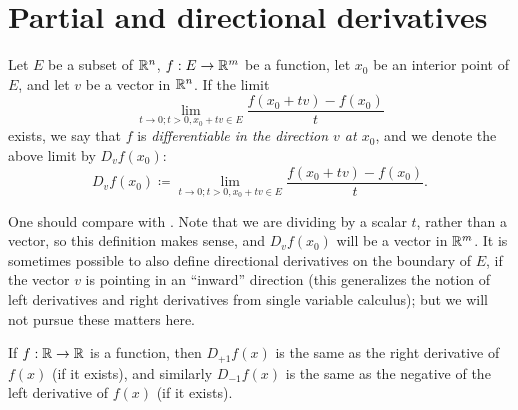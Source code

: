 \section{Partial and directional derivatives}\label{ii:sec:6.3}

\begin{defn}\label{ii:6.3.1}
  Let \(E\) be a subset of \(\mathbb{R}^n\), \(f : E \to \mathbb{R}^m\) be a function, let \(x_0\) be an interior point of \(E\), and let \(v\) be a vector in \(\mathbb{R}^n\).
  If the limit
  \[
    \lim_{t \to 0 ; t > 0, x_0 + tv \in E} \dfrac{f(x_0 + tv) - f(x_0)}{t}
  \]
  exists, we say that \(f\) is \emph{differentiable in the direction \(v\) at \(x_0\)}, and we denote the above limit by \(D_v f(x_0)\):
  \[
    D_v f(x_0) \coloneqq \lim_{t \to 0 ; t > 0, x_0 + tv \in E} \dfrac{f(x_0 + tv) - f(x_0)}{t}.
  \]
\end{defn}

\begin{rmk}\label{ii:6.3.2}
  One should compare  with .
  Note that we are dividing by a scalar \(t\), rather than a vector, so this definition makes sense, and \(D_v f(x_0)\) will be a vector in \(\mathbb{R}^m\).
  It is sometimes possible to also define directional derivatives on the boundary of \(E\), if the vector \(v\) is pointing in an ``inward'' direction
  (this generalizes the notion of left derivatives and right derivatives from single variable calculus);
  but we will not pursue these matters here.
\end{rmk}

\begin{eg}\label{ii:6.3.3}
  If \(f : \mathbb{R} \to \mathbb{R}\) is a function, then \(D_{+1} f(x)\) is the same as the right derivative of \(f(x)\) (if it exists), and similarly \(D_{-1} f(x)\) is the same as the negative of the left derivative of \(f(x)\) (if it exists).
\end{eg}


